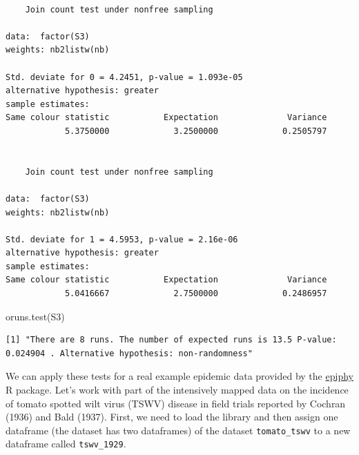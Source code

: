 \documentclass[
  letterpaper,
  DIV=11,
  numbers=noendperiod]{scrreprt}
\newenvironment{Shaded}{\begin{snugshade}}{\end{snugshade}}
\newcommand{\CommentTok}[1]{\textcolor[rgb]{0.37,0.37,0.37}{#1}}
\newcommand{\DecValTok}[1]{\textcolor[rgb]{0.68,0.00,0.00}{#1}}
\newcommand{\FunctionTok}[1]{\textcolor[rgb]{0.28,0.35,0.67}{#1}}
\newcommand{\NormalTok}[1]{\textcolor[rgb]{0.00,0.23,0.31}{#1}}
\newcommand{\OtherTok}[1]{\textcolor[rgb]{0.00,0.23,0.31}{#1}}
\newcommand{\SpecialCharTok}[1]{\textcolor[rgb]{0.37,0.37,0.37}{#1}}
\begin{document}
\begin{verbatim}

    Join count test under nonfree sampling

data:  factor(S3) 
weights: nb2listw(nb) 

Std. deviate for 0 = 4.2451, p-value = 1.093e-05
alternative hypothesis: greater
sample estimates:
Same colour statistic           Expectation              Variance 
            5.3750000             3.2500000             0.2505797 


    Join count test under nonfree sampling

data:  factor(S3) 
weights: nb2listw(nb) 

Std. deviate for 1 = 4.5953, p-value = 2.16e-06
alternative hypothesis: greater
sample estimates:
Same colour statistic           Expectation              Variance 
            5.0416667             2.7500000             0.2486957 
\end{verbatim}

\begin{Shaded}
\begin{Highlighting}[]
\FunctionTok{oruns.test}\NormalTok{(S3)}
\end{Highlighting}
\end{Shaded}

\begin{verbatim}
[1] "There are 8 runs. The number of expected runs is 13.5 P-value: 0.024904 . Alternative hypothesis: non-randomness"
\end{verbatim}

We can apply these tests for a real example epidemic data provided by
the \href{https://chgigot.github.io/epiphy/}{epiphy} R package. Let's
work with part of the intensively mapped data on the incidence of tomato
spotted wilt virus (TSWV) disease in field trials reported by Cochran
(1936) and Bald (1937). First, we need to load the library and then
assign one dataframe (the dataset has two dataframes) of the dataset
\texttt{tomato\_tswv} to a new dataframe called \texttt{tswv\_1929}.

\begin{Shaded}
\end{Shaded}
\end{document}
